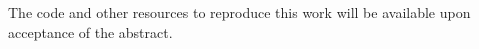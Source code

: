 \documentclass[mlabstract,twocolumn]{jmlr}
\begin{document}
The code and other resources to reproduce this work will be available upon acceptance of the abstract.




\newpage

\newpage
\appendix


\end{document}
